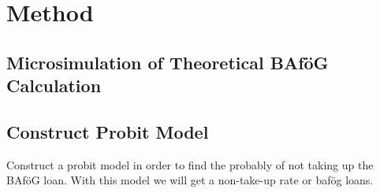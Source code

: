 \section{Method} 

\subsection{Microsimulation of Theoretical BAföG Calculation}

\subsection{Construct Probit Model}
Construct a probit model in order to find the probably of not taking up the BAföG loan. 
With this model we will get a non-take-up rate or bafög loans.

